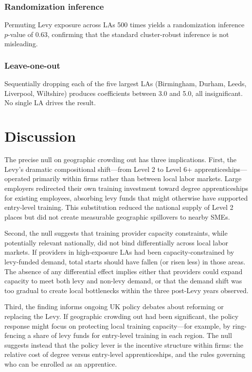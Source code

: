 \documentclass[12pt]{article}
\begin{document}
\subsubsection*{Randomization inference} Permuting Levy exposure across LAs 500 times yields a randomization inference $p$-value of 0.63, confirming that the standard cluster-robust inference is not misleading.

\subsubsection*{Leave-one-out} Sequentially dropping each of the five largest LAs (Birmingham, Durham, Leeds, Liverpool, Wiltshire) produces coefficients between 3.0 and 5.0, all insignificant. No single LA drives the result.



\section{Discussion}

The precise null on geographic crowding out has three implications. First, the Levy's dramatic compositional shift---from Level 2 to Level 6+ apprenticeships---operated primarily within firms rather than between local labor markets. Large employers redirected their own training investment toward degree apprenticeships for existing employees, absorbing levy funds that might otherwise have supported entry-level training. This substitution reduced the national supply of Level 2 places but did not create measurable geographic spillovers to nearby SMEs.

Second, the null suggests that training provider capacity constraints, while potentially relevant nationally, did not bind differentially across local labor markets. If providers in high-exposure LAs had been capacity-constrained by levy-funded demand, total starts should have fallen (or risen less) in those areas. The absence of any differential effect implies either that providers could expand capacity to meet both levy and non-levy demand, or that the demand shift was too gradual to create local bottlenecks within the three post-Levy years observed.

Third, the finding informs ongoing UK policy debates about reforming or replacing the Levy. If geographic crowding out had been significant, the policy response might focus on protecting local training capacity---for example, by ring-fencing a share of levy funds for entry-level training in each region. The null suggests instead that the policy lever is the incentive structure within firms: the relative cost of degree versus entry-level apprenticeships, and the rules governing who can be enrolled as an apprentice.
\end{document}
